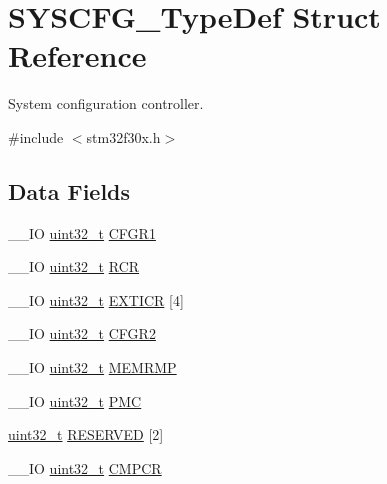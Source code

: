 \hypertarget{struct_s_y_s_c_f_g___type_def}{\section{S\-Y\-S\-C\-F\-G\-\_\-\-Type\-Def Struct Reference}
\label{struct_s_y_s_c_f_g___type_def}
}


System configuration controller.  




{\ttfamily \#include $<$stm32f30x.\-h$>$}

\subsection*{Data Fields}
\begin{DoxyCompactItemize}
\item 
\-\_\-\-\_\-\-I\-O \hyperlink{stdint_8h_a435d1572bf3f880d55459d9805097f62}{uint32\-\_\-t} \hyperlink{struct_s_y_s_c_f_g___type_def_a5e0e229c223361eee4278d585787ace1}{C\-F\-G\-R1}
\item 
\-\_\-\-\_\-\-I\-O \hyperlink{stdint_8h_a435d1572bf3f880d55459d9805097f62}{uint32\-\_\-t} \hyperlink{struct_s_y_s_c_f_g___type_def_a6b19ffd6acd9c6a5103b93dd64281f63}{R\-C\-R}
\item 
\-\_\-\-\_\-\-I\-O \hyperlink{stdint_8h_a435d1572bf3f880d55459d9805097f62}{uint32\-\_\-t} \hyperlink{struct_s_y_s_c_f_g___type_def_a348aafac7a09a6e93e73e5acbccc34d3}{E\-X\-T\-I\-C\-R} \mbox{[}4\mbox{]}
\item 
\-\_\-\-\_\-\-I\-O \hyperlink{stdint_8h_a435d1572bf3f880d55459d9805097f62}{uint32\-\_\-t} \hyperlink{struct_s_y_s_c_f_g___type_def_aa643f1162e93489204200a465e11fd86}{C\-F\-G\-R2}
\item 
\-\_\-\-\_\-\-I\-O \hyperlink{stdint_8h_a435d1572bf3f880d55459d9805097f62}{uint32\-\_\-t} \hyperlink{struct_s_y_s_c_f_g___type_def_a85b9d3df2274b730327b181c402a7bf5}{M\-E\-M\-R\-M\-P}
\item 
\-\_\-\-\_\-\-I\-O \hyperlink{stdint_8h_a435d1572bf3f880d55459d9805097f62}{uint32\-\_\-t} \hyperlink{struct_s_y_s_c_f_g___type_def_ab5c47c570566cb8ff9d0436c17cc9241}{P\-M\-C}
\item 
\hyperlink{stdint_8h_a435d1572bf3f880d55459d9805097f62}{uint32\-\_\-t} \hyperlink{struct_s_y_s_c_f_g___type_def_a43926e6d31a976a0018b2d1f5c92645d}{R\-E\-S\-E\-R\-V\-E\-D} \mbox{[}2\mbox{]}
\item 
\-\_\-\-\_\-\-I\-O \hyperlink{stdint_8h_a435d1572bf3f880d55459d9805097f62}{uint32\-\_\-t} \hyperlink{struct_s_y_s_c_f_g___type_def_ada13497abc6402300570ff5f430a612e}{C\-M\-P\-C\-R}
\end{DoxyCompactItemize}


